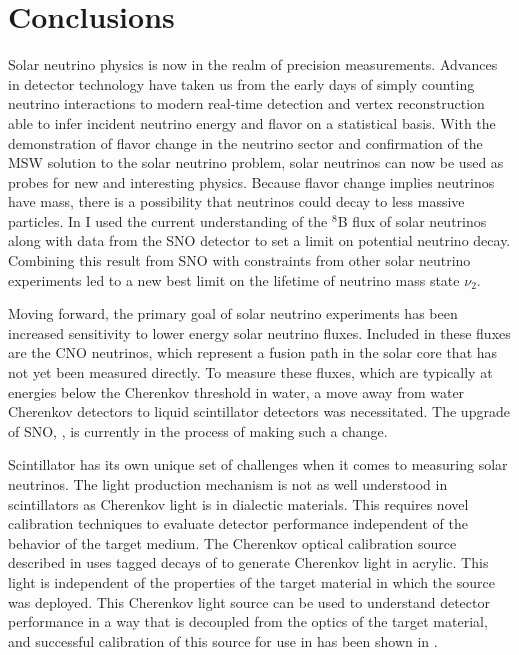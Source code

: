 \chapter{Conclusions}

Solar neutrino physics is now in the realm of precision measurements.
Advances in detector technology have taken us from the early days of simply counting neutrino interactions to modern real-time detection and vertex reconstruction able to infer incident neutrino energy and flavor on a statistical basis.
With the demonstration of flavor change in the neutrino sector and confirmation of the MSW solution to the solar neutrino problem, solar neutrinos can now be used as probes for new and interesting physics.
Because flavor change implies neutrinos have mass, there is a possibility that neutrinos could decay to less massive particles.
In  I used the current understanding of the $^8$B flux of solar neutrinos along with data from the SNO detector to set a limit on potential neutrino decay.
Combining this result from SNO with constraints from other solar neutrino experiments led to a new best limit on the lifetime of neutrino mass state $\nu_2$.

Moving forward, the primary goal of solar neutrino experiments has been increased sensitivity to lower energy solar neutrino fluxes.
Included in these fluxes are the CNO neutrinos, which represent a fusion path in the solar core that has not yet been measured directly.
To measure these fluxes, which are typically at energies below the Cherenkov threshold in water, a move away from water Cherenkov detectors to liquid scintillator detectors was necessitated.
The upgrade of SNO, {\snop}, is currently in the process of making such a change.

Scintillator has its own unique set of challenges when it comes to measuring solar neutrinos.
The light production mechanism is not as well understood in scintillators as Cherenkov light is in dialectic materials.
This requires novel calibration techniques to evaluate detector performance independent of the behavior of the target medium.
The Cherenkov optical calibration source described in  uses tagged decays of \Li to generate Cherenkov light in acrylic.
This light is independent of the properties of the target material in which the source was deployed.
This Cherenkov light source can be used to understand detector performance in a way that is decoupled from the optics of the target material, and successful calibration of this source for use in {\snop} has been shown in .


